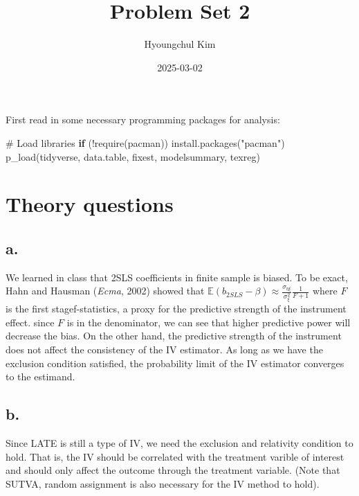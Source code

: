 \documentclass[
  letterpaper,
  DIV=11,
  numbers=noendperiod]{scrartcl}
\title{Problem Set 2}
\author{Hyoungchul Kim}
\date{2025-03-02}
\newenvironment{Shaded}{\begin{snugshade}}{\end{snugshade}}
\newcommand{\CommentTok}[1]{\textcolor[rgb]{0.37,0.37,0.37}{#1}}
\newcommand{\ControlFlowTok}[1]{\textcolor[rgb]{0.00,0.23,0.31}{\textbf{#1}}}
\newcommand{\FunctionTok}[1]{\textcolor[rgb]{0.28,0.35,0.67}{#1}}
\newcommand{\NormalTok}[1]{\textcolor[rgb]{0.00,0.23,0.31}{#1}}
\newcommand{\SpecialCharTok}[1]{\textcolor[rgb]{0.37,0.37,0.37}{#1}}
\newcommand{\StringTok}[1]{\textcolor[rgb]{0.13,0.47,0.30}{#1}}
\begin{document}
\maketitle


First read in some necessary programming packages for analysis:

\begin{Shaded}
\begin{Highlighting}[]
\CommentTok{\# Load libraries}
\ControlFlowTok{if}\NormalTok{ (}\SpecialCharTok{!}\FunctionTok{require}\NormalTok{(pacman)) }\FunctionTok{install.packages}\NormalTok{(}\StringTok{"pacman"}\NormalTok{)}
\FunctionTok{p\_load}\NormalTok{(tidyverse, data.table, fixest, modelsummary, texreg)}
\end{Highlighting}
\end{Shaded}

\section{Theory questions}\label{theory-questions}

\subsection{a.}\label{a.}

We learned in class that 2SLS coefficients in finite sample is biased.
To be exact, Hahn and Hausman (\emph{Ecma}, 2002) showed that
\(\mathbb{E}(b_{2SLS} - \beta) \approx \frac{\sigma_{\eta \xi}}{\sigma^2_\xi} \frac{1}{F+1}\)
where \(F\) is the first stagef-statistics, a proxy for the predictive
strength of the instrument effect. since \(F\) is in the denominator, we
can see that higher predictive power will decrease the bias. On the
other hand, the predictive strength of the instrument does not affect
the consistency of the IV estimator. As long as we have the exclusion
condition satisfied, the probability limit of the IV estimator converges
to the estimand.

\subsection{b.}\label{b.}

Since LATE is still a type of IV, we need the exclusion and relativity
condition to hold. That is, the IV should be correlated with the
treatment varible of interest and should only affect the outcome through
the treatment variable. (Note that SUTVA, random assignment is also
necessary for the IV method to hold).
\end{document}
